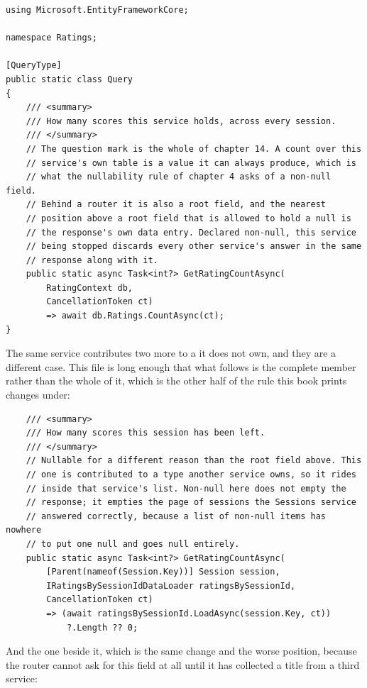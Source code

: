 \begin{verbatim}
using Microsoft.EntityFrameworkCore;

namespace Ratings;

[QueryType]
public static class Query
{
    /// <summary>
    /// How many scores this service holds, across every session.
    /// </summary>
    // The question mark is the whole of chapter 14. A count over this
    // service's own table is a value it can always produce, which is
    // what the nullability rule of chapter 4 asks of a non-null field.
    // Behind a router it is also a root field, and the nearest
    // position above a root field that is allowed to hold a null is
    // the response's own data entry. Declared non-null, this service
    // being stopped discards every other service's answer in the same
    // response along with it.
    public static async Task<int?> GetRatingCountAsync(
        RatingContext db,
        CancellationToken ct)
        => await db.Ratings.CountAsync(ct);
}
\end{verbatim}

%
The same service contributes two more to a  it does not own, and
they are a different case. This file is long enough that what follows is the
complete member rather than the whole of it, which is the other half of the
rule this book prints changes under:

\begin{verbatim}
    /// <summary>
    /// How many scores this session has been left.
    /// </summary>
    // Nullable for a different reason than the root field above. This
    // one is contributed to a type another service owns, so it rides
    // inside that service's list. Non-null here does not empty the
    // response; it empties the page of sessions the Sessions service
    // answered correctly, because a list of non-null items has nowhere
    // to put one null and goes null entirely.
    public static async Task<int?> GetRatingCountAsync(
        [Parent(nameof(Session.Key))] Session session,
        IRatingsBySessionIdDataLoader ratingsBySessionId,
        CancellationToken ct)
        => (await ratingsBySessionId.LoadAsync(session.Key, ct))
            ?.Length ?? 0;
\end{verbatim}

%
And the one beside it, which is the same change and the worse position, because
the router cannot ask for this field at all until it has collected a title from
a third service:

